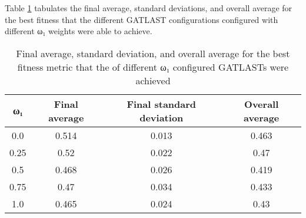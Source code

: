 Table \ref{tab:HP:GA:LTLWeight:best fitness} tabulates the final average, standard deviations, and overall average for the best fitness that the different GATLAST configurations configured with different ω₁ weights were able to achieve.
\begin{table}[tbh!]
\centering
\begin{adjustbox}{trim=0cm 0cm 0cm 0cm, clip=true}
\begin{tabular}{|c|c|c|c|}
\hline
ω₁ & Final average & Final standard deviation & Overall average\\
\hline
0.0 & 0.514 & 0.013 & 0.463\\\hline
0.25 & 0.52 & 0.022 & 0.47\\\hline
0.5 & 0.468 & 0.026 & 0.419\\\hline
0.75 & 0.47 & 0.034 & 0.433\\\hline
1.0 & 0.465 & 0.024 & 0.43\\\hline
\end{tabular}
\end{adjustbox}
\caption{Final average, standard deviation, and overall average for the best fitness metric that the of different ω₁ configured GATLASTs were achieved}
\label{tab:HP:GA:LTLWeight:best fitness}
\end{table}